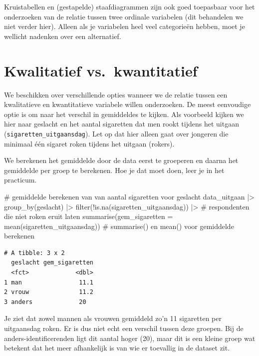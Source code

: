 \documentclass[
  letterpaper,
  DIV=11,
  numbers=noendperiod]{scrreprt}
\newenvironment{Shaded}{\begin{snugshade}}{\end{snugshade}}
\newcommand{\AttributeTok}[1]{\textcolor[rgb]{0.40,0.45,0.13}{#1}}
\newcommand{\CommentTok}[1]{\textcolor[rgb]{0.37,0.37,0.37}{#1}}
\newcommand{\FunctionTok}[1]{\textcolor[rgb]{0.28,0.35,0.67}{#1}}
\newcommand{\NormalTok}[1]{\textcolor[rgb]{0.00,0.23,0.31}{#1}}
\newcommand{\SpecialCharTok}[1]{\textcolor[rgb]{0.37,0.37,0.37}{#1}}
\begin{document}
Kruistabellen en (gestapelde) staafdiagrammen zijn ook goed toepasbaar
voor het onderzoeken van de relatie tussen twee ordinale variabelen (dit
behandelen we niet verder hier). Alleen als je variabelen heel veel
categorieën hebben, moet je wellicht nadenken over een alternatief.

\section{Kwalitatief
vs.~kwantitatief}\label{kwalitatief-vs.-kwantitatief}

We beschikken over verschillende opties wanneer we de relatie tussen een
kwalitatieve en kwantitatieve variabele willen onderzoeken. De meest
eenvoudige optie is om naar het verschil in gemiddeldes te kijken. Als
voorbeeld kijken we hier naar geslacht en het aantal sigaretten dat men
rookt tijdens het uitgaan (\texttt{sigaretten\_uitgaansdag}). Let op dat
hier alleen gaat over jongeren die minimaal één sigaret roken tijdens
het uitgaan (rokers).

We berekenen het gemiddelde door de data eerst te groeperen en daarna
het gemiddelde per groep te berekenen. Hoe je dat moet doen, leer je in
het practicum.

\begin{Shaded}
\begin{Highlighting}[]
\CommentTok{\# gemiddelde berekenen van van aantal sigaretten voor geslacht}
\NormalTok{data\_uitgaan }\SpecialCharTok{|\textgreater{}} \FunctionTok{group\_by}\NormalTok{(geslacht) }\SpecialCharTok{|\textgreater{}}
  \FunctionTok{filter}\NormalTok{(}\SpecialCharTok{!}\FunctionTok{is.na}\NormalTok{(sigaretten\_uitgaansdag)) }\SpecialCharTok{|\textgreater{}} \CommentTok{\# respondenten die niet roken eruit laten}
  \FunctionTok{summarise}\NormalTok{(}\AttributeTok{gem\_sigaretten =} \FunctionTok{mean}\NormalTok{(sigaretten\_uitgaansdag)) }\CommentTok{\# summarise() en mean() voor gemiddelde berekenen}
\end{Highlighting}
\end{Shaded}

\begin{verbatim}
# A tibble: 3 x 2
  geslacht gem_sigaretten
  <fct>             <dbl>
1 man                11.1
2 vrouw              11.2
3 anders             20  
\end{verbatim}

Je ziet dat zowel mannen als vrouwen gemiddeld zo'n 11 sigaretten per
uitgaansdag roken. Er is dus niet echt een verschil tussen deze groepen.
Bij de anders-identificerenden ligt dit aantal hoger (20), maar dit is
een kleine groep wat betekent dat het meer afhankelijk is van wie er
toevallig in de dataset zit.
\end{document}

